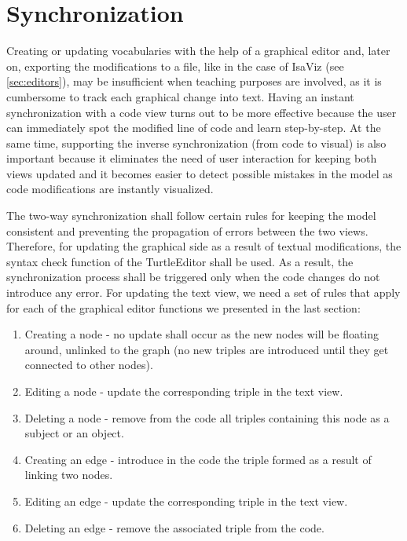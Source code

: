 \section {Synchronization}

Creating or updating vocabularies with the help of a graphical editor and, later on, exporting the modifications to a file, like in the case of IsaViz (see \autoref{sec:editors}), may be insufficient when teaching purposes are involved, as it is cumbersome to track each graphical change into text. Having an instant synchronization with a code view turns out to be more effective because the user can immediately spot the modified line of code and learn step-by-step. At the same time, supporting the inverse synchronization (from code to visual) is also important because it eliminates the need of user interaction for keeping both views updated and it becomes easier to detect possible mistakes in the model as code modifications are instantly visualized.

The two-way synchronization shall follow certain rules for keeping the model consistent and preventing the propagation of errors between the two views. Therefore, for updating the graphical side as a result of textual modifications, the syntax check function of the TurtleEditor shall be used. As a result, the synchronization process shall be triggered only when the code changes do not introduce any error. For updating the text view, we need a set of rules that apply for each of the graphical editor functions we presented in the last section:

\begin{enumerate}
  \item Creating a node - no update shall occur as the new nodes will be floating around, unlinked to the graph (no new triples are introduced until they get connected to other nodes).
  \item Editing a node - update the corresponding triple in the text view.
  \item Deleting a node - remove from the code all triples containing this node as a subject or an object.
  \item Creating an edge - introduce in the code the triple formed as a result of linking two nodes.
  \item Editing an edge - update the corresponding triple in the text view.
  \item Deleting an edge - remove the associated triple from the code.
\end{enumerate}

